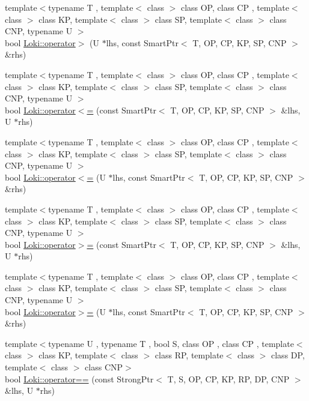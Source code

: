 \begin{DoxyCompactItemize}
\item 
{\footnotesize template$<$typename T , template$<$ class $>$ class O\+P, class C\+P , template$<$ class $>$ class K\+P, template$<$ class $>$ class S\+P, template$<$ class $>$ class C\+N\+P, typename U $>$ }\\bool \hyperlink{group__SmartPointerGroup_ga00cd20c13933b70e7bb734527502c674}{Loki\+::operator$>$} (U $\ast$lhs, const Smart\+Ptr$<$ T, O\+P, C\+P, K\+P, S\+P, C\+N\+P $>$ \&rhs)
\item 
{\footnotesize template$<$typename T , template$<$ class $>$ class O\+P, class C\+P , template$<$ class $>$ class K\+P, template$<$ class $>$ class S\+P, template$<$ class $>$ class C\+N\+P, typename U $>$ }\\bool \hyperlink{group__SmartPointerGroup_gacdb4a26ac587767f90a6f31fa2b59975}{Loki\+::operator$<$=} (const Smart\+Ptr$<$ T, O\+P, C\+P, K\+P, S\+P, C\+N\+P $>$ \&lhs, U $\ast$rhs)
\item 
{\footnotesize template$<$typename T , template$<$ class $>$ class O\+P, class C\+P , template$<$ class $>$ class K\+P, template$<$ class $>$ class S\+P, template$<$ class $>$ class C\+N\+P, typename U $>$ }\\bool \hyperlink{group__SmartPointerGroup_gae9b52490dde1823ba37309c4435d8757}{Loki\+::operator$<$=} (U $\ast$lhs, const Smart\+Ptr$<$ T, O\+P, C\+P, K\+P, S\+P, C\+N\+P $>$ \&rhs)
\item 
{\footnotesize template$<$typename T , template$<$ class $>$ class O\+P, class C\+P , template$<$ class $>$ class K\+P, template$<$ class $>$ class S\+P, template$<$ class $>$ class C\+N\+P, typename U $>$ }\\bool \hyperlink{group__SmartPointerGroup_ga6ecb015692643d88fa04ba2eaa1bc72e}{Loki\+::operator$>$=} (const Smart\+Ptr$<$ T, O\+P, C\+P, K\+P, S\+P, C\+N\+P $>$ \&lhs, U $\ast$rhs)
\item 
{\footnotesize template$<$typename T , template$<$ class $>$ class O\+P, class C\+P , template$<$ class $>$ class K\+P, template$<$ class $>$ class S\+P, template$<$ class $>$ class C\+N\+P, typename U $>$ }\\bool \hyperlink{group__SmartPointerGroup_ga21e42b6dac17e9ce23d32c7a9309b09c}{Loki\+::operator$>$=} (U $\ast$lhs, const Smart\+Ptr$<$ T, O\+P, C\+P, K\+P, S\+P, C\+N\+P $>$ \&rhs)
\item 
{\footnotesize template$<$typename U , typename T , bool S, class O\+P , class C\+P , template$<$ class $>$ class K\+P, template$<$ class $>$ class R\+P, template$<$ class $>$ class D\+P, template$<$ class $>$ class C\+N\+P$>$ }\\bool \hyperlink{group__SmartPointerGroup_ga07aa8a1b2cb0199fb22738a7092756bc}{Loki\+::operator==} (const Strong\+Ptr$<$ T, S, O\+P, C\+P, K\+P, R\+P, D\+P, C\+N\+P $>$ \&lhs, U $\ast$rhs)

\end{DoxyCompactItemize}
